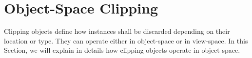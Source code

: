 \section{Object-Space Clipping}

Clipping objects define how instances shall be discarded depending on their location or type.
They can operate either in object-space or in view-space.
In this Section, we will explain in details how clipping objects operate in object-space.


